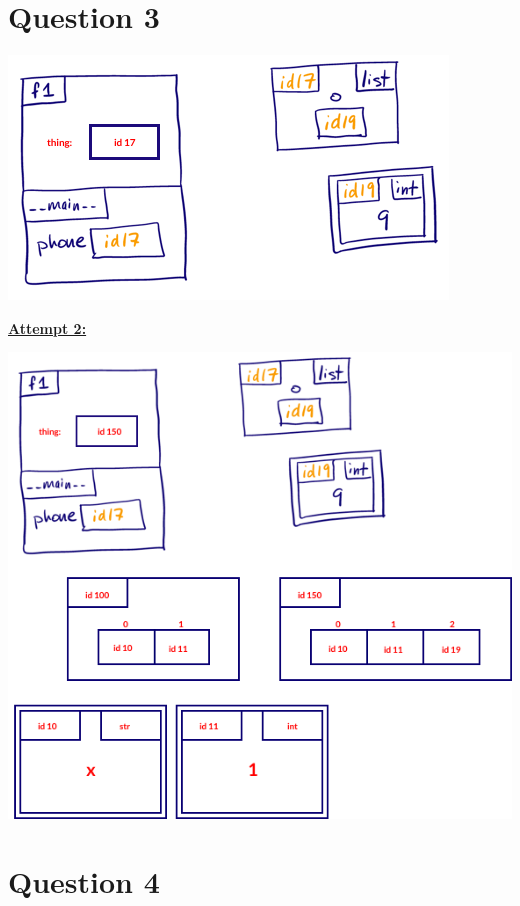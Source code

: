 \documentclass[12pt]{article}
\begin{document}
\section*{Question 3}
\begin{center}
\includegraphics[width=0.5\linewidth]{images/worksheet_1_q3_solution.png}
\end{center}

\bigskip

\begin{mdframed}
    \underline{\textbf{Attempt 2:}}

    \bigskip

    \begin{center}
    \includegraphics[width=0.5\linewidth]{images/worksheet_1_q3_correction.png}
    \end{center}

\end{mdframed}

\section*{Question 4}
\end{document}

